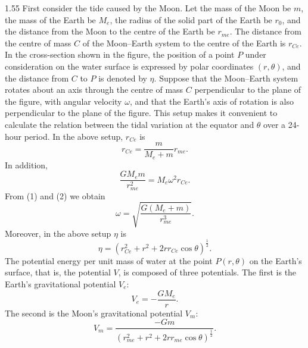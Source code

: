\begin{solution}{1.55}
First consider the tide caused by the Moon. Let the mass of the Moon be $m$, the mass of the Earth be $M_e$, the radius of the solid part of the Earth be $r_0$, and the distance from the Moon to the centre of the Earth be $r_{me}$. The distance from the centre of mass $C$ of the Moon--Earth system to the centre of the Earth is $r_{Ce}$. In the cross-section shown in the figure, the position of a point $P$ under consideration on the water surface is expressed by polar coordinates $(r,\theta)$, and the distance from $C$ to $P$ is denoted by $\eta$. Suppose that the Moon--Earth system rotates about an axis through the centre of mass $C$ perpendicular to the plane of the figure, with angular velocity $\omega$, and that the Earth's axis of rotation is also perpendicular to the plane of the figure. This setup makes it convenient to calculate the relation between the tidal variation at the equator and $\theta$ over a 24-hour period. In the above setup, $r_{Ce}$ is
\begin{equation}
r_{Ce}=\frac{m}{M_e+m}r_{me}. \tag{1}
\end{equation}
In addition,
\begin{equation}
\frac{GM_em}{r_{me}^2}=M_e\omega^2r_{Ce}. \tag{2}
\end{equation}
From (1) and (2) we obtain
\begin{equation}
\omega=\sqrt{\frac{G\left(M_e+m\right)}{r_{me}^3}}. \tag{3}
\end{equation}
Moreover, in the above setup $\eta$ is
\begin{equation}
\eta=\left(r_{Ce}^2+r^2+2rr_{Ce}\cos\theta\right)^{\frac{1}{2}}. \tag{4}
\end{equation}
The potential energy per unit mass of water at the point $P(r,\theta)$ on the Earth's surface, that is, the potential $V$, is composed of three potentials. The first is the Earth's gravitational potential $V_e$:
\begin{equation}
V_e=-\frac{GM_e}{r}. \tag{5}
\end{equation}
The second is the Moon's gravitational potential $V_m$:
\begin{equation}
V_m=\frac{-Gm}{\left(r_{me}^2+r^2+2rr_{me}\cos\theta\right)^{\frac{1}{2}}}. \tag{6}
\end{equation}


\end{solution}
